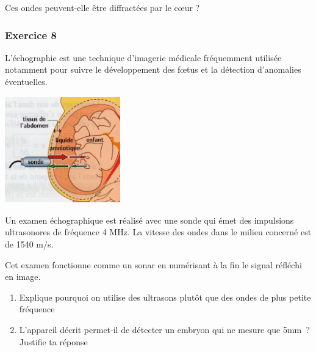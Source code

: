 {Ces ondes peuvent-elle être diffractées par le cœur ?

\subsubsection{Exercice 8}

L'échographie est une technique d'imagerie médicale fréquemment utilisée
notamment pour suivre le développement des fœtus et la détection
d'anomalies éventuelles.

\includegraphics[width=5.009cm,height=4.621cm]{Pictures/1000000000000301000002BCCF7FB7734DEACB0A.jpg}

Un examen échographique est réalisé avec une sonde qui émet des
impulsions ultrasonores de fréquence 4 MHz. La vitesse des ondes dans le
milieu concerné est de 1540 m/s.

Cet examen fonctionne comme un sonar en numérisant à la fin le signal
réfléchi en image.

\begin{enumerate}
\item  Explique pourquoi on utilise des ultrasons plutôt que des ondes de
  plus petite fréquence
\item  L'appareil décrit permet-il de détecter un embryon qui ne mesure que
  5mm~? Justifie ta réponse
\end{enumerate}

}
